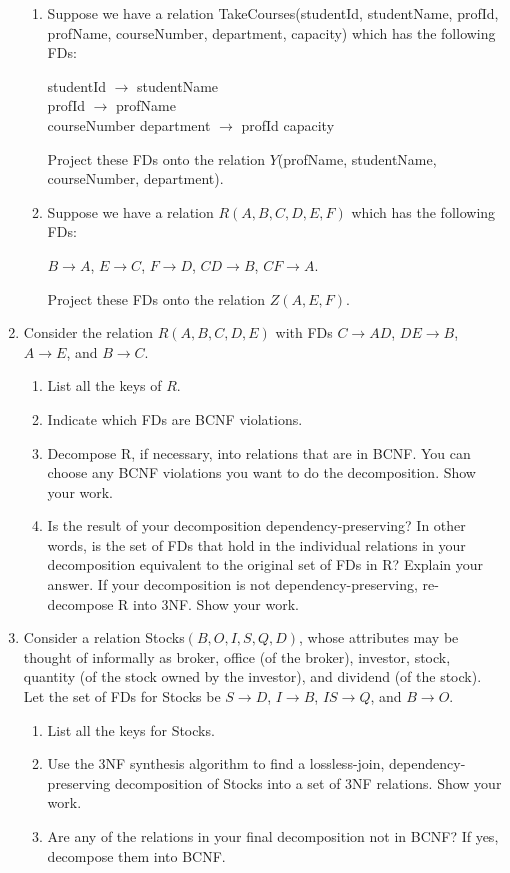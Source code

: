 \documentclass[11pt]{article}
\begin{document}
\begin{enumerate}
\begin{enumerate}
		\item Suppose we have a relation TakeCourses(studentId, studentName, profId, profName, courseNumber, department, capacity)
		which has the following FDs:
		
		studentId $\to$ studentName \\
		profId $\to$ profName \\
		courseNumber department $\to$ profId capacity
		
		Project these FDs onto the relation $Y$(profName, studentName, courseNumber, department).
		
		\item Suppose we have a relation $R(A, B, C, D, E, F)$ which has the following FDs:
		
		$B \to A$, $E \to C$, $F \to D$, $CD \to B$, $CF \to A$.
		
		Project these FDs onto the relation $Z(A, E, F)$.
	\end{enumerate}

\item Consider the relation $R(A, B, C, D, E)$ with FDs $C\to AD$, $DE \to B$, $A \to E$,
	and $B \to C$.
	\begin{enumerate}
		\item List all the keys of $R$.
		\item Indicate which FDs are BCNF violations.
		\item Decompose R, if necessary, into relations that are in BCNF.  You can choose
		any BCNF violations you want to do the decomposition.  Show your work.
		\item Is the result of your decomposition dependency-preserving?  In other words,
		is the set of FDs that hold in the individual relations in your decomposition equivalent
		to the original set of FDs in R?  Explain your answer.  If your decomposition is
		not dependency-preserving, re-decompose R into 3NF.  Show your work.
		
	\end{enumerate}
	
	\item Consider a relation Stocks$(B, O, I, S, Q, D)$, whose attributes may be thought of informally as broker, office (of the broker), investor, stock, quantity (of the stock owned by the investor), and dividend (of the stock). Let the set of FDs for Stocks be $S \to D$, 
	$I \to B$, $IS \to Q$, and $B \to O$.
	
	\begin{enumerate}
		\item List all the keys for Stocks.
		\item Use the 3NF synthesis algorithm to find a lossless-join, dependency-preserving decomposition of Stocks into a set of 3NF relations. Show your work.
		\item Are any of the relations in your final decomposition not in BCNF?  If yes, decompose them into BCNF.
	\end{enumerate}
	
	
\end{enumerate}
\end{document}
